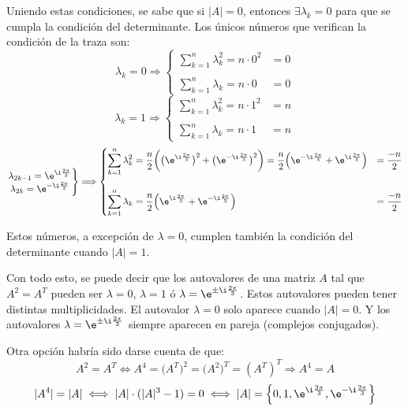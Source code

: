 \documentclass[../../main.tex]{subfiles}
\begin{document}
  Uniendo estas condiciones, se sabe que si $|A| = 0$, entonces $\exists \lambda_k = 0$ para que se cumpla la condición del determinante. Los únicos números que verifican la condición de la traza son:
  $$
  \lambda_k = 0
  \Longrightarrow
  \begin{cases}
    \displaystyle\sum_{k = 1}^n \lambda_k^2 = n \cdot 0^2 & = 0 \\ \\
    \displaystyle\sum_{k = 1}^n \lambda_k = n \cdot 0 & = 0
  \end{cases}
  $$
  $$
  \lambda_k = 1
  \Longrightarrow
  \begin{cases}
    \displaystyle\sum_{k = 1}^n \lambda_k^2 = n \cdot 1^2 & = n \\ \\
    \displaystyle\sum_{k = 1}^n \lambda_k = n \cdot 1 & = n
  \end{cases}
  $$
  $$
  \left .
    \begin{matrix}
      \lambda_{2k - 1} = \e^{\i \frac{2\pi}{3}} \\
      \lambda_{2k} = \e^{-\i \frac{2\pi}{3}}
    \end{matrix}
  \right \}
  \Longrightarrow
  \begin{cases}
    \displaystyle\sum_{k = 1}^n \lambda_k^2 =
    \frac{n}{2} \bigg(\big(\e^{\i \frac{2\pi}{3}}\big)^2 + \big(\e^{-\i \frac{2\pi}{3}}\big)^2 \bigg) =
    \frac{n}{2} \Big(\e^{-\i \frac{2\pi}{3}} + \e^{\i \frac{2\pi}{3}}\Big) & =
    \displaystyle\frac{-n}{2} \\ \\
    \displaystyle\sum_{k = 1}^n \lambda_k =
    \frac{n}{2} \Big(\e^{\i \frac{2\pi}{3}} + \e^{-\i \frac{2\pi}{3}}\Big) & =
    \displaystyle\frac{-n}{2}
  \end{cases}
  $$

  Estos números, a excepción de $\lambda = 0$, cumplen también la condición del determinante cuando $|A| = 1$.

  Con todo esto, se puede decir que los autovalores de una matriz $A$ tal que $A^2 = A^T$ pueden ser $\lambda = 0$, $\lambda = 1$ ó $\lambda = \e^{\pm \i \frac{2\pi}{3}}$. Estos autovalores pueden tener distintas multiplicidades. El autovalor $\lambda = 0$ solo aparece cuando $|A| = 0$. Y los autovalores $\lambda = \e^{\pm \i \frac{2\pi}{3}}$ siempre aparecen en pareja (complejos conjugados).

  Otra opción habría sido darse cuenta de que:
  $$
  A^2 = A^T \iff A^4 = \big(A^T\big)^2 = \big(A^2\big)^T = (A^T)^T \Longrightarrow A^4 = A
  $$
  $$
  |A^4| = |A| \iff |A| \cdot (|A|^3 - 1) = 0 \iff |A| = \left\{0, 1, \e^{\i \frac{2\pi}{3}}, \e^{-\i \frac{2\pi}{3}}\right\}
  $$
\end{document}
